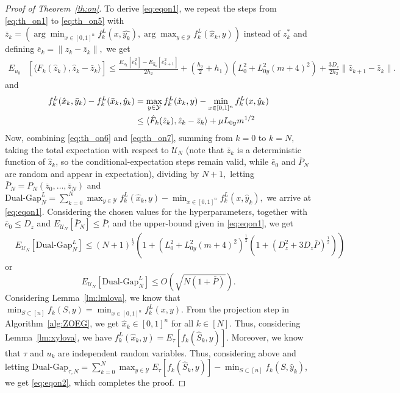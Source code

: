 \documentclass{article}
\theoremstyle{plain}
\theoremstyle{definition}
\theoremstyle{remark}
\begin{document}
\begin{proof}[Proof of Theorem~\ref{th:on}]
    To derive \eqref{eq:eqon1}, we repeat %
    the steps from \eqref{eq:th_on1} to \eqref{eq:th_on5} with $\bar{z}_k =(\arg\min_{x\in [0,1]^n} f_k^L(x,\hat{y_k}),\arg\max_{y\in \mathcal{Y}} f_k^L(\hat{x}_k,y))$ instead of $z^\ast_k$ and defining $\bar{e}_k=\|z_k-\bar{z}_k\|,$ we get
    \begin{align}\label{eq:th_on6}
    E_{u_k}&[\langle \hat{F}_k(\hat{z}_k),\hat{z}_k-\bar{z}_k\rangle]\leq \frac{E_{u_k}[\bar{e}_k^2]-E_{\hat{u}_k}[\bar{e}_{k+1}^2]}{2h_2} +(\tfrac{h_2}{2}+h_1)( L_0^2 + L_{0y}^2(m+4)^2)+\frac{3D_z}{2h_2}\|\bar{z}_{k+1}-\bar
    z_{k}\|. 
    \end{align}
    and 
    \begin{align}\label{eq:th_on7}
       f_k^L(\hat{x}_k,\bar{y}_k) - f_k^L(\bar{x}_k,\hat{y}_k)&=\max_{y\in\mathcal{Y}}f^L_k(\hat{x}_k,y)  -    \min_{x \in [0,1]^n} f^L_k(x,\hat{y}_k) \notag\\&\leq\langle \hat{F}_k(\hat{z}_k),\hat{z}_k-\bar{z}_k\rangle+\mu L_{0y}m^{1/2}
    \end{align}
    Now, combining \eqref{eq:th_on6} and \eqref{eq:th_on7}, summing from $k=0$ to $k=N,$ taking the total expectation with respect to $\mathcal{U}_{N}$ (note that $\bar{z}_k$ is a deterministic function of $\hat{z}_k$, so the conditional-expectation steps remain valid, while $\bar{e}_0$ and $\bar{P}_N$ are random and appear in expectation), %
    dividing by $N+1,$ letting $\bar{P}_N=P_N(\bar{z}_0,\dots,\bar{z}_N)$ and $\text{Dual-Gap}^L_N =\sum_{k=0}^N \max_{y\in\mathcal{Y}}f^L_k(\hat{x}_k,y) - \min_{x \in [0,1]^n} f^L_k(x,\hat{y}_k),$ we arrive at \eqref{eq:eqon1}.  Considering the chosen values for the hyperparameters, together with $\bar{e}_0\leq D_z$ and $E_{\mathcal{U}_N}[\bar{P}_N]\leq\bar{P}$, and the upper-bound given in \eqref{eq:eqon1}, we get
    \begin{align}%
        &E_{\mathcal{U}_{N}}[\text{Dual-Gap}^L_{N}]\leq
         (N+1)^\frac{1}{2}(1+( L_0^2+L_{0y}^2(m+4)^2)^\frac{1}{2}(1+(D_z^2+3D_z\bar{P})^\frac{1}{2}))
    \end{align}
    or
    \[ E_{\mathcal{U}_{N}}[\text{Dual-Gap}^L_{N}]\leq O(\sqrt{N(1+\bar{P})}).\]
    Considering Lemma~\ref{lm:lmlova}, we know that $\min_{S \subset [n]}f_k(S,y) = \min_{x\in[0,1]^n}f^L_k(x,y)$. From
    the projection step in Algorithm~\ref{alg:ZOEG}, we get
    ${\hat{x}_k}\in[0,1]^n$ for all $k \in [N].$ Thus, considering Lemma~\ref{lm:xylova}, we have $f_k^L({\hat{x}_k},y) = E_\tau[f_k({\hat{S}_k},y)].$ Moreover, we know that $\tau$ and $u_k$ are independent random variables.
    Thus, considering above and letting $\text{Dual-Gap}_{\tau,N} = \sum_{k=0}^N \max_{y\in\mathcal{Y}}E_\tau[f_k(\hat{S}_k,y)] - \min_{S \subset [n]} f_k(S,\hat{y}_k)$, we get \eqref{eq:eqon2},
    which completes the proof.
    

\end{proof}
\end{document}
